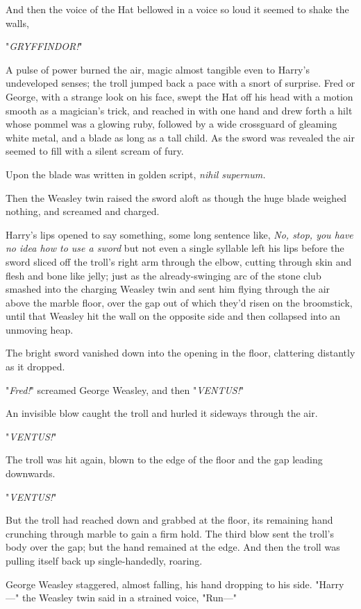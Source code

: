 And then the voice of the Hat bellowed in a voice so loud it seemed to shake
the walls,

"\emph{GRYFFINDOR!}"

A pulse of power burned the air, magic almost tangible even to Harry's
undeveloped senses; the troll jumped back a pace with a snort of surprise. Fred or
George, with a strange look on his face, swept the Hat off his head with a
motion smooth as a magician's trick, and reached in with one hand and drew
forth a hilt whose pommel was a glowing ruby, followed by a wide crossguard of
gleaming white metal, and a blade as long as a tall child. As the sword was
revealed the air seemed to fill with a silent scream of fury.

Upon the blade was written in golden script, \emph{nihil supernum.}

Then the Weasley twin raised the sword aloft as though the huge blade weighed
nothing, and screamed and charged.

Harry's lips opened to say something, some long sentence like, \emph{No, stop,
you have no idea how to use a sword} but not even a single syllable left his
lips before the sword sliced off the troll's right arm through the elbow,
cutting through skin and flesh and bone like jelly; just as the
already-swinging arc of the stone club smashed into the charging Weasley twin
and sent him flying through the air above the marble floor, over the gap out of
which they'd risen on the broomstick, until that Weasley hit the wall on the
opposite side and then collapsed into an unmoving heap.

The bright sword vanished down into the opening in the floor, clattering
distantly as it dropped.

"\emph{Fred!}" screamed George Weasley, and then "\emph{VENTUS!}"

An invisible blow caught the troll and hurled it sideways through the air.

"\emph{VENTUS!}"

The troll was hit again, blown to the edge of the floor and the gap leading
downwards.

"\emph{VENTUS!}"

But the troll had reached down and grabbed at the floor, its remaining hand
crunching through marble to gain a firm hold. The third blow sent the troll's
body over the gap; but the hand remained at the edge. And then the troll was
pulling itself back up single-handedly, roaring.

George Weasley staggered, almost falling, his hand dropping to his side.
"Harry---" the Weasley twin said in a strained voice, "Run---"

